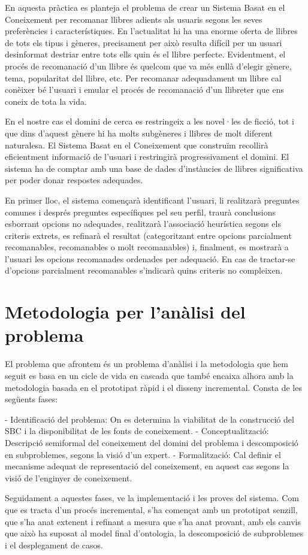 
En aquesta pràctica es planteja el problema de crear un Sistema Basat en el Coneixement per recomanar llibres adients als usuaris segons les seves preferències i característiques. En l'actualitat hi ha una enorme oferta de llibres de tots els tipus i gèneres, precisament per això resulta difícil per un usuari desinformat destriar entre tots ells quin és el llibre perfecte. Evidentment, el procés de recomanació d'un llibre és quelcom que va més enllà d'elegir gènere, tema, popularitat del llibre, etc. Per recomanar adequadament un llibre cal conèixer bé l'usuari i emular el procés de recomanació d'un llibreter que ens coneix de tota la vida.

En el nostre cas el domini de cerca es restringeix a les novel·les de ficció, tot i que dins d'aquest gènere hi ha molts subgèneres i llibres de molt diferent naturalesa. El Sistema Basat en el Coneixement que construïm recollirà eficientment informació de l'usuari i restringirà progressivament el domini. El sistema ha de comptar amb una base de dades d'instàncies de llibres significativa per poder donar respostes adequades.

En primer lloc, el sistema començarà identificant l'usuari, li realitzarà preguntes comunes i després preguntes específiques pel seu perfil, traurà conclusions esborrant opcions no adequades, realitzarà l'associació heurística segons els criteris extrets, es refinarà el resultat (categoritzant entre opcions parcialment recomanables, recomanables o molt recomanables) i, finalment, es mostrarà a l'usuari les opcions recomanades ordenades per adequació. En cas de tractar-se d'opcions parcialment recomanables s'indicarà quins criteris no compleixen.

\section{Metodologia per l'anàlisi del problema}

El problema que afrontem és un problema d'anàlisi i la metodologia que hem seguit es basa en un cicle de vida en cascada que també encaixa alhora amb la metodologia basada en el prototipat ràpid i el disseny incremental. Consta de les següents fases:

- Identificació del problema: On es determina la viabilitat de la construcció del SBC i la disponibilitat de les fonts de coneixement.
- Conceptualització: Descripció semiformal del coneixement del domini del problema i descomposició en subproblemes, segons la visió d'un expert.
- Formalització: Cal definir el mecanisme adequat de representació del coneixement, en aquest cas segons la visió de l'enginyer de coneixement.

Seguidament a aquestes fases, ve la implementació i les proves del sistema. Com que es tracta d'un procés incremental, s'ha començat amb un prototipat senzill, que s'ha anat extenent i refinant a mesura que s'ha anat provant, amb els canvis que això ha suposat al model final d'ontologia, la descomposició de subproblemes i el desplegament de casos.